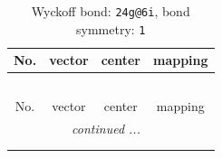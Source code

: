 \documentclass[fleqn,8pt]{jsarticle}
\begin{document}
\renewcommand{\arraystretch}{1.2}
\begin{longtable}{cccc}
\caption{Wyckoff bond: {\tt 24g@6i}, bond symmetry: {\tt 1}}
 \\
 \hline \hline
No. & vector & center & mapping \\ \hline \endfirsthead

\multicolumn{3}{l}{\tablename\ \thetable{}} \\
 \hline \hline
No. & vector & center & mapping \\ \hline \endhead

 \hline \hline
\multicolumn{3}{r}{\footnotesize\it continued ...} \\ \endfoot

 \hline \hline
\multicolumn{3}{r}{} \\ \endlastfoot


\end{longtable}
\end{document}
